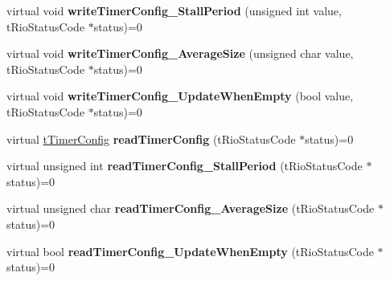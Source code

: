 \begin{DoxyCompactItemize}
\item 
\hypertarget{classnFPGA_1_1nFRC__2012__1__6__4_1_1tEncoder_adbb446acc342f3e33a5a6098b4b92158}{
virtual void {\bfseries writeTimerConfig\_\-StallPeriod} (unsigned int value, tRioStatusCode $\ast$status)=0}
\label{classnFPGA_1_1nFRC__2012__1__6__4_1_1tEncoder_adbb446acc342f3e33a5a6098b4b92158}

\item 
\hypertarget{classnFPGA_1_1nFRC__2012__1__6__4_1_1tEncoder_a9b013cbaff49dd715c32fd440e758314}{
virtual void {\bfseries writeTimerConfig\_\-AverageSize} (unsigned char value, tRioStatusCode $\ast$status)=0}
\label{classnFPGA_1_1nFRC__2012__1__6__4_1_1tEncoder_a9b013cbaff49dd715c32fd440e758314}

\item 
\hypertarget{classnFPGA_1_1nFRC__2012__1__6__4_1_1tEncoder_a40cbde48de46ad4b8236f930c6abecf7}{
virtual void {\bfseries writeTimerConfig\_\-UpdateWhenEmpty} (bool value, tRioStatusCode $\ast$status)=0}
\label{classnFPGA_1_1nFRC__2012__1__6__4_1_1tEncoder_a40cbde48de46ad4b8236f930c6abecf7}

\item 
\hypertarget{classnFPGA_1_1nFRC__2012__1__6__4_1_1tEncoder_a250b01a27edf2ec63981a0bd56243751}{
virtual \hyperlink{unionnFPGA_1_1nFRC__2012__1__6__4_1_1tEncoder_1_1tTimerConfig}{tTimerConfig} {\bfseries readTimerConfig} (tRioStatusCode $\ast$status)=0}
\label{classnFPGA_1_1nFRC__2012__1__6__4_1_1tEncoder_a250b01a27edf2ec63981a0bd56243751}

\item 
\hypertarget{classnFPGA_1_1nFRC__2012__1__6__4_1_1tEncoder_a073656f9979640cb9620612669af1600}{
virtual unsigned int {\bfseries readTimerConfig\_\-StallPeriod} (tRioStatusCode $\ast$status)=0}
\label{classnFPGA_1_1nFRC__2012__1__6__4_1_1tEncoder_a073656f9979640cb9620612669af1600}

\item 
\hypertarget{classnFPGA_1_1nFRC__2012__1__6__4_1_1tEncoder_aa2f750df94feafcb04aafdff611c0e5f}{
virtual unsigned char {\bfseries readTimerConfig\_\-AverageSize} (tRioStatusCode $\ast$status)=0}
\label{classnFPGA_1_1nFRC__2012__1__6__4_1_1tEncoder_aa2f750df94feafcb04aafdff611c0e5f}

\item 
\hypertarget{classnFPGA_1_1nFRC__2012__1__6__4_1_1tEncoder_ae2b6169fd8b2aee892b9e7b3aa27b440}{
virtual bool {\bfseries readTimerConfig\_\-UpdateWhenEmpty} (tRioStatusCode $\ast$status)=0}
\label{classnFPGA_1_1nFRC__2012__1__6__4_1_1tEncoder_ae2b6169fd8b2aee892b9e7b3aa27b440}

\end{DoxyCompactItemize}
